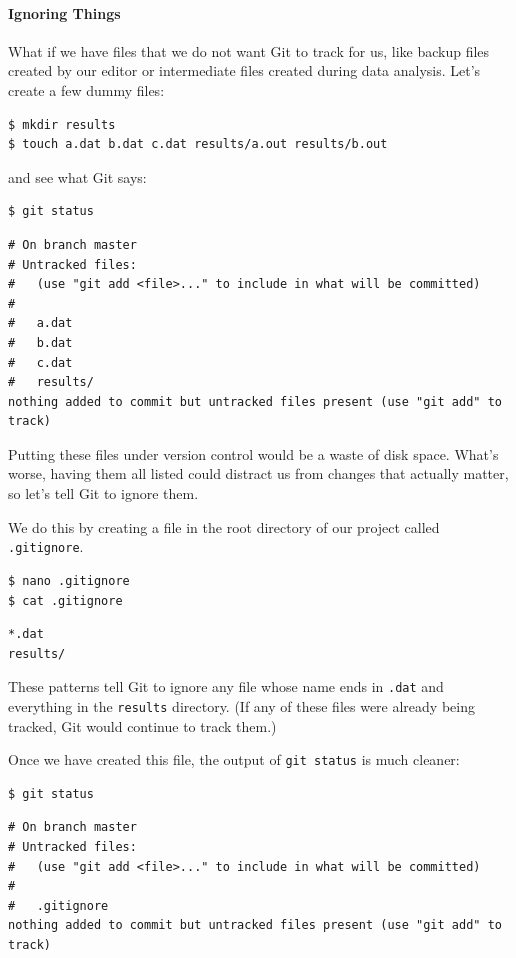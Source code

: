 \documentclass[]{book}
\begin{document}
\mbox{}\paragraph{Ignoring Things}

What if we have files that we do not want Git to track for us, like
backup files created by our editor or intermediate files created during
data analysis. Let's create a few dummy files:

\begin{verbatim}
$ mkdir results
$ touch a.dat b.dat c.dat results/a.out results/b.out
\end{verbatim}

and see what Git says:

\begin{verbatim}
$ git status
\end{verbatim}

\begin{verbatim}
# On branch master
# Untracked files:
#   (use "git add <file>..." to include in what will be committed)
#
#   a.dat
#   b.dat
#   c.dat
#   results/
nothing added to commit but untracked files present (use "git add" to track)
\end{verbatim}

Putting these files under version control would be a waste of disk
space. What's worse, having them all listed could distract us from
changes that actually matter, so let's tell Git to ignore them.

We do this by creating a file in the root directory of our project
called \texttt{.gitignore}.

\begin{verbatim}
$ nano .gitignore
$ cat .gitignore
\end{verbatim}

\begin{verbatim}
*.dat
results/
\end{verbatim}

These patterns tell Git to ignore any file whose name ends in
\texttt{.dat} and everything in the \texttt{results} directory. (If any
of these files were already being tracked, Git would continue to track
them.)

Once we have created this file, the output of \texttt{git status} is
much cleaner:

\begin{verbatim}
$ git status
\end{verbatim}

\begin{verbatim}
# On branch master
# Untracked files:
#   (use "git add <file>..." to include in what will be committed)
#
#   .gitignore
nothing added to commit but untracked files present (use "git add" to track)
\end{verbatim}
\end{document}
